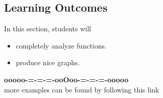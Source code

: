 \documentclass{ximera}
\begin{document}
\subsection*{Learning Outcomes}





\begin{sectionOutcomes}
In this section, students will 

\begin{itemize}
\item completely analyze functions.
\item produce nice graphs.
\end{itemize}
\end{sectionOutcomes}
















\begin{center}
\textbf{\textcolor{green!50!black}{ooooo-=-=-=-ooOoo-=-=-=-ooooo}} \\

more examples can be found by following this link\\ 

\end{center}
\end{document}

